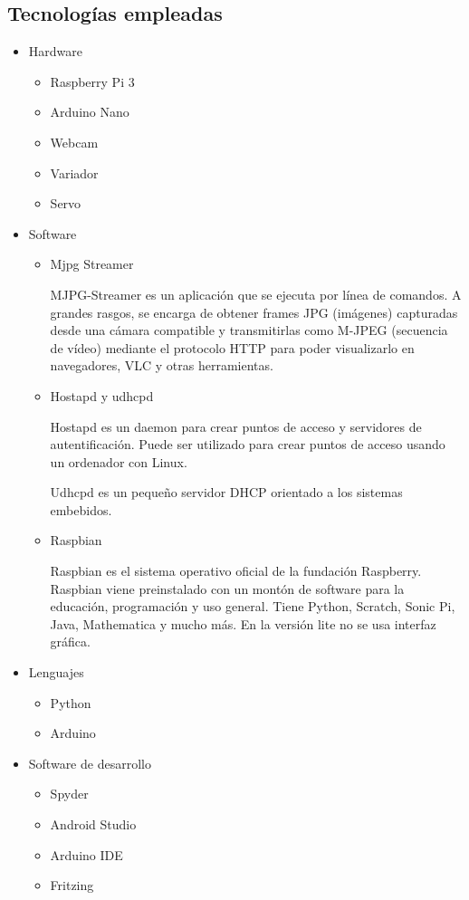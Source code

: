 \documentclass{pclass}
\begin{document}
\subsection{Tecnologías empleadas}

\begin{itemize}
	\item Hardware
		\begin{itemize}
			\item Raspberry Pi 3
			\item Arduino Nano
			\item Webcam
			\item Variador
			\item Servo
		\end{itemize}
	\item Software
	\begin{itemize}
		\item Mjpg Streamer
		
		MJPG-Streamer es un aplicación que se ejecuta por línea de comandos. A grandes rasgos, se encarga de obtener frames JPG (imágenes) capturadas desde una cámara compatible y transmitirlas como M-JPEG (secuencia de vídeo) mediante el protocolo HTTP para poder visualizarlo en navegadores, VLC y otras herramientas.
			\cite{mjpg}
		
		\item Hostapd y udhcpd
		
		Hostapd es un daemon para crear puntos de acceso y servidores de autentificación. Puede ser utilizado para crear puntos de acceso usando un ordenador con Linux. 
		
		Udhcpd es un pequeño servidor DHCP orientado a los sistemas embebidos.
		
			\cite{wireless}
		
		\item Raspbian	
		
		Raspbian es el sistema operativo oficial de la fundación Raspberry. Raspbian viene preinstalado con un montón de software para la educación, programación y uso general. Tiene Python, Scratch, Sonic Pi, Java, Mathematica y mucho más. En la versión lite no se usa interfaz gráfica.
		
			\cite{raspbian}
				
	\end{itemize}
	\item Lenguajes
		\begin{itemize}
			\item Python
			\item Arduino
		\end{itemize}
	\item Software de desarrollo
	\begin{itemize}
		\item Spyder
		\item Android Studio
		\item Arduino IDE
		\item Fritzing
		

\end{itemize}
\end{itemize}
\end{document}
